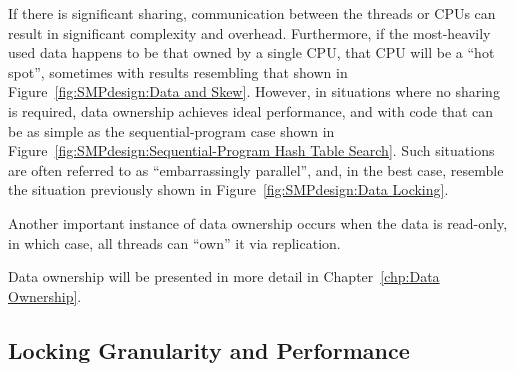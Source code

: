 If there is significant sharing, communication between the threads
or CPUs can result in significant complexity and overhead.
Furthermore, if the most-heavily used data happens to be that owned
by a single CPU, that CPU will be a ``hot spot'', sometimes with
results resembling that shown in Figure~\ref{fig:SMPdesign:Data and Skew}.
However, in situations where no sharing is required, data ownership
achieves ideal performance, and with code that can be as simple
as the sequential-program case shown in
Figure~\ref{fig:SMPdesign:Sequential-Program Hash Table Search}.
Such situations are often referred to as ``embarrassingly
parallel'', and, in the best case, resemble the situation
previously shown in Figure~\ref{fig:SMPdesign:Data Locking}.



Another important instance of data ownership occurs when the data
is read-only, in which case,
all threads can ``own'' it via replication.

Data ownership will be presented in more detail in
Chapter~\ref{chp:Data Ownership}.

\subsection{Locking Granularity and Performance}
\label{sec:SMPdesign:Locking Granularity and Performance}

